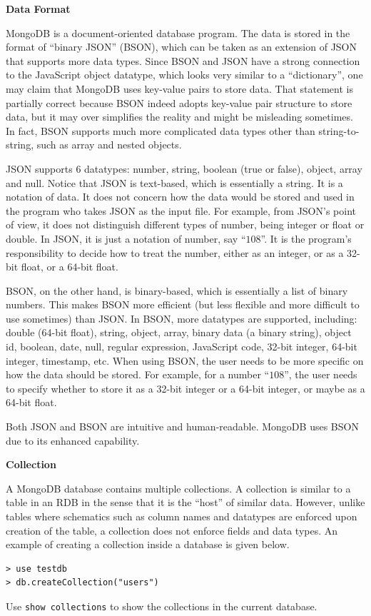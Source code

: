 \vspace{0.1in}
\noindent \textbf{Data Format}
\vspace{0.1in}

MongoDB is a document-oriented database program. The data is stored in the format of ``binary JSON'' (BSON), which can be taken as an extension of JSON that supports more data types. Since BSON and JSON have a strong connection to the JavaScript object datatype, which looks very similar to a ``dictionary'', one may claim that MongoDB uses key-value pairs to store data. That statement is partially correct because BSON indeed adopts key-value pair structure to store data, but it may over simplifies the reality and might be misleading sometimes. In fact, BSON supports much more complicated data types other than string-to-string, such as array and nested objects.

JSON supports 6 datatypes: number, string, boolean (true or false), object, array and null. Notice that JSON is text-based, which is essentially a string. It is a notation of data. It does not concern how the data would be stored and used in the program who takes JSON as the input file. For example, from JSON's point of view, it does not distinguish different types of number, being integer or float or double. In JSON, it is just a notation of number, say ``$108$''. It is the program's responsibility to decide how to treat the number, either as an integer, or as a 32-bit float, or a 64-bit float.

BSON, on the other hand, is binary-based, which is essentially a list of binary numbers. This makes BSON more efficient (but less flexible and more difficult to use sometimes) than JSON. In BSON, more datatypes are supported, including: double (64-bit float), string, object, array, binary data (a binary string), object id, boolean, date, null, regular expression, JavaScript code, 32-bit integer, 64-bit integer, timestamp, etc. When using BSON, the user needs to be more specific on how the data should be stored. For example, for a number ``$108$'', the user needs to specify whether to store it as a 32-bit integer or a 64-bit integer, or maybe as a 64-bit float.

Both JSON and BSON are intuitive and human-readable. MongoDB uses BSON due to its enhanced capability.

\vspace{0.1in}
\noindent \textbf{Collection}
\vspace{0.1in}

A MongoDB database contains multiple collections. A collection is similar to a table in an RDB in the sense that it is the ``host'' of similar data. However, unlike tables where schematics such as column names and datatypes are enforced upon creation of the table, a collection does not enforce fields and data types. An example of creating a collection inside a database is given below.
\begin{lstlisting}
> use testdb
> db.createCollection("users")
\end{lstlisting}
Use \verb|show collections| to show the collections in the current database.

